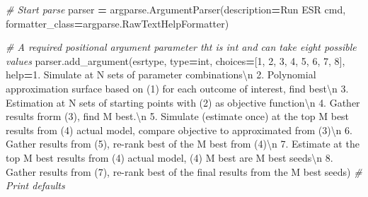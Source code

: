 \documentclass[
]{book}
\newenvironment{Shaded}{\begin{snugshade}}{\end{snugshade}}
\newcommand{\BuiltInTok}[1]{#1}
\newcommand{\CharTok}[1]{\textcolor[rgb]{0.31,0.60,0.02}{#1}}
\newcommand{\CommentTok}[1]{\textcolor[rgb]{0.56,0.35,0.01}{\textit{#1}}}
\newcommand{\DecValTok}[1]{\textcolor[rgb]{0.00,0.00,0.81}{#1}}
\newcommand{\NormalTok}[1]{#1}
\newcommand{\OperatorTok}[1]{\textcolor[rgb]{0.81,0.36,0.00}{\textbf{#1}}}
\newcommand{\StringTok}[1]{\textcolor[rgb]{0.31,0.60,0.02}{#1}}
\begin{document}
\begin{Shaded}
\begin{Highlighting}[]
\CommentTok{\# Start parse}
\NormalTok{parser }\OperatorTok{=}\NormalTok{ argparse.ArgumentParser(description}\OperatorTok{=}\StringTok{\textquotesingle{}Run ESR cmd\textquotesingle{}}\NormalTok{, formatter\_class}\OperatorTok{=}\NormalTok{argparse.RawTextHelpFormatter)}

\CommentTok{\# A required positional argument parameter tht is int and can take eight possible values}
\NormalTok{parser.add\_argument(}\StringTok{\textquotesingle{}esrtype\textquotesingle{}}\NormalTok{, }\BuiltInTok{type}\OperatorTok{=}\BuiltInTok{int}\NormalTok{,}
\NormalTok{                    choices}\OperatorTok{=}\NormalTok{[}\DecValTok{1}\NormalTok{, }\DecValTok{2}\NormalTok{, }\DecValTok{3}\NormalTok{, }\DecValTok{4}\NormalTok{, }\DecValTok{5}\NormalTok{, }\DecValTok{6}\NormalTok{, }\DecValTok{7}\NormalTok{, }\DecValTok{8}\NormalTok{],}
                    \BuiltInTok{help}\OperatorTok{=}\StringTok{\textquotesingle{}1. Simulate at N sets of parameter combinations}\CharTok{\textbackslash{}n}\StringTok{\textquotesingle{}}
                         \StringTok{\textquotesingle{}2. Polynomial approximation surface based on (1) \textquotesingle{}}
                         \StringTok{\textquotesingle{}for each outcome of interest, find best}\CharTok{\textbackslash{}n}\StringTok{\textquotesingle{}}
                         \StringTok{\textquotesingle{}3. Estimation at N sets of starting points with (2) as objective function}\CharTok{\textbackslash{}n}\StringTok{\textquotesingle{}}
                         \StringTok{\textquotesingle{}4. Gather results frorm (3), find M best.}\CharTok{\textbackslash{}n}\StringTok{\textquotesingle{}}
                         \StringTok{\textquotesingle{}5. Simulate (estimate once) at the top M best results from (4) actual model, \textquotesingle{}}
                         \StringTok{\textquotesingle{}compare objective to approximated from (3)}\CharTok{\textbackslash{}n}\StringTok{\textquotesingle{}}
                         \StringTok{\textquotesingle{}6. Gather results from (5), re{-}rank best of the M best from (4)}\CharTok{\textbackslash{}n}\StringTok{\textquotesingle{}}
                         \StringTok{\textquotesingle{}7. Estimate at the top M best results from (4) actual model, \textquotesingle{}}
                         \StringTok{\textquotesingle{}(4) M best are M best seeds}\CharTok{\textbackslash{}n}\StringTok{\textquotesingle{}}
                         \StringTok{\textquotesingle{}8. Gather results from (7), re{-}rank best of the final results from the M best seeds\textquotesingle{}}\NormalTok{)}
\CommentTok{\# Print defaults}
\end{Highlighting}
\end{Shaded}
\end{document}
